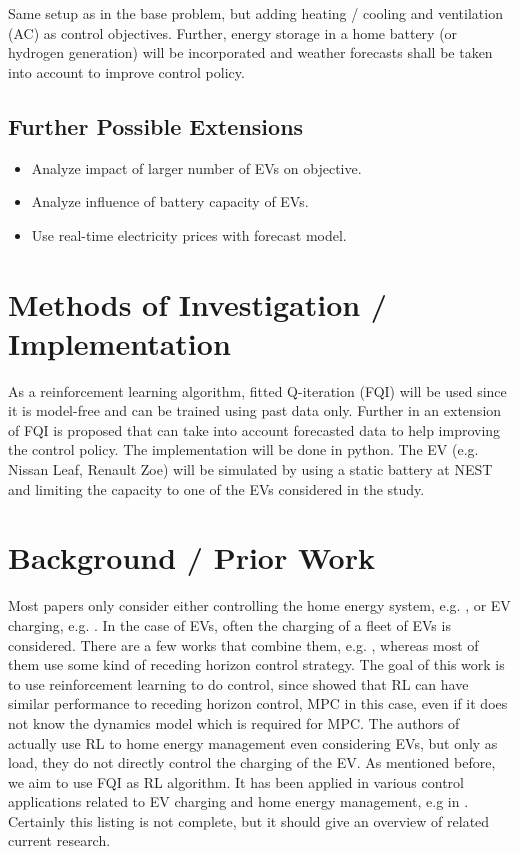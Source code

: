 \documentclass[letterpaper]{scrartcl}
\begin{document}
	Same setup as in the base problem, but 
	adding heating / cooling and ventilation (AC) as control 
	objectives. Further, energy storage in a home battery (or hydrogen generation)
	will be incorporated and weather forecasts shall be taken into 
	account to improve control policy.
	
	\subsection{Further Possible Extensions} 
	
	\begin{itemize}
		\item Analyze impact of larger number of EVs on objective.
		\item Analyze influence of battery capacity of EVs.
		\item Use real-time electricity prices with forecast model. 
	\end{itemize}
		
	\section{Methods of Investigation / Implementation}
	
	As a reinforcement learning algorithm, fitted Q-iteration (FQI)
	will be used since it is model-free and can be trained using
	past data only. Further in \cite{7401112} an extension of FQI is
	proposed that can take into account forecasted data to help improving 
	the control policy.
	The implementation will be done in python. 
	The EV (e.g. Nissan Leaf, Renault Zoe) will be simulated by using a static 
	battery at NEST and limiting the capacity to one of the EVs 
	considered in the study.
	
	\section{Background / Prior Work}
	
	Most papers only consider either controlling the home
	energy system, e.g. \cite{8060306, CHEN2018195, 7401112}, or
	EV charging, e.g. 
	\cite{6102330, 7178338, 6695263, 8727484, 8335743, 7056534}. 
	In the case of EVs, often the charging of
	a fleet of EVs is considered. There are a few works that combine
	them, e.g. \cite{en11082010, 6892986, 7552560, 6547831, 6596523}, whereas
	most of them use some kind of receding horizon control strategy.
	The goal of this work is to use reinforcement learning to do control,
	since \cite{4717266} showed that RL can have similar performance to 
	receding horizon control, MPC in this case, even if it does
	not know the dynamics model which is required for MPC. 
	The authors of \cite{en11082010} actually use RL to home energy
	management even considering EVs, but only as load, they do not
	directly control the charging of the EV. As mentioned before, 
	we aim to use FQI as RL algorithm. 	
	It has been applied in various control applications related to 
	EV charging and home energy management, e.g in 
	\cite{7401112, 7178338, 8727484, 7056534}. Certainly this listing 
	is not complete, but it should give an overview of related current research.
	
\end{document}

